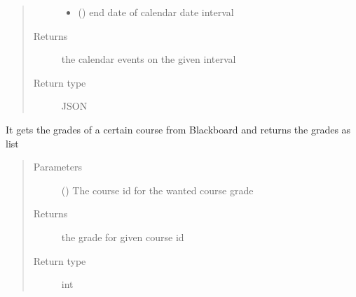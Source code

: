 \documentclass[letterpaper,10pt,english]{sphinxmanual}
\begin{document}
\begin{fulllineitems}
\begin{fulllineitems}
\begin{quote}
\begin{description}
\begin{itemize}
\item {} 
\sphinxAtStartPar
{} () \textendash{} end date of calendar date interval

\end{itemize}

\item[{Returns}] \leavevmode
\sphinxAtStartPar
the calendar events on the given interval

\item[{Return type}] \leavevmode
\sphinxAtStartPar
JSON

\end{description}\end{quote}

\end{fulllineitems}


\begin{fulllineitems}
\label{\detokenize{BlackBoardAPI:BlackBoardAPI.BlackBoardAPI.getGrades}}
\pysigstartsignatures
{}
\pysigstopsignatures
\sphinxAtStartPar
It gets the grades of a certain course from Blackboard and returns the grades as list
\begin{quote}\begin{description}
\item[{Parameters}] \leavevmode
\sphinxAtStartPar
{} () \textendash{} The course id for the wanted course grade

\item[{Returns}] \leavevmode
\sphinxAtStartPar
the grade for given course id

\item[{Return type}] \leavevmode
\sphinxAtStartPar
int

\end{description}\end{quote}

\end{fulllineitems}


\end{fulllineitems}

\end{document}

